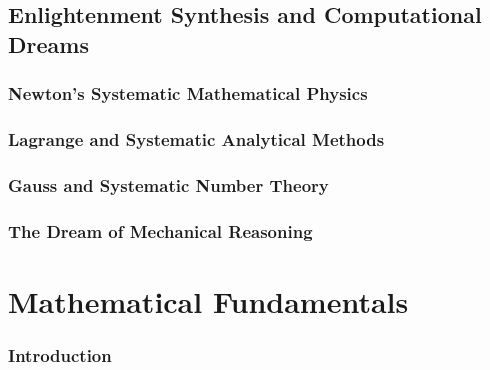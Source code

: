 \documentclass[12pt, oneside, openany]{book}
\let\oldchapter\chapter
\renewcommand{\chapter}{
	\cleardoublepage
	\thispagestyle{chapter}
	\oldchapter
}
\begin{document}
\chapter{Enlightenment Synthesis and Computational Dreams}

\section{Newton's Systematic Mathematical Physics}

\section{Lagrange and Systematic Analytical Methods}

\section{Gauss and Systematic Number Theory}

\section{The Dream of Mechanical Reasoning}


\part{Mathematical Fundamentals}
\section*{Introduction}
\end{document}
